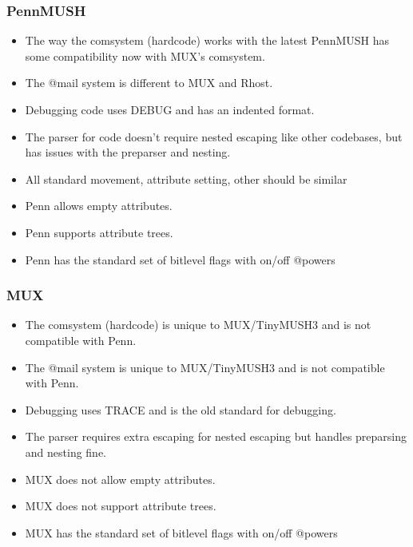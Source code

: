 \documentclass[letterpaper,10pt,english]{sphinxmanual}
\begin{document}
\subsubsection{PennMUSH}
\label{\detokenize{differences:pennmush}}\begin{itemize}
\item {} 
\sphinxAtStartPar
The way the comsystem (hardcode) works with the latest PennMUSH has some
compatibility now with MUX’s comsystem.

\item {} 
\sphinxAtStartPar
The @mail system is different to MUX and Rhost.

\item {} 
\sphinxAtStartPar
Debugging code uses DEBUG and has an indented format.

\item {} 
\sphinxAtStartPar
The parser for code doesn’t require nested escaping like other codebases, but has issues with the pre\sphinxhyphen{}parser and nesting.

\item {} 
\sphinxAtStartPar
All standard movement, attribute setting, other should be similar

\item {} 
\sphinxAtStartPar
Penn allows empty attributes.

\item {} 
\sphinxAtStartPar
Penn supports attribute trees.

\item {} 
\sphinxAtStartPar
Penn has the standard set of bitlevel flags with on/off @powers

\end{itemize}


\subsubsection{MUX}
\label{\detokenize{differences:mux}}\begin{itemize}
\item {} 
\sphinxAtStartPar
The comsystem (hardcode) is unique to MUX/TinyMUSH3 and is not compatible with Penn.

\item {} 
\sphinxAtStartPar
The @mail system is unique to MUX/TinyMUSH3 and is not compatible with Penn.

\item {} 
\sphinxAtStartPar
Debugging uses TRACE and is the old standard for debugging.

\item {} 
\sphinxAtStartPar
The parser requires extra escaping for nested escaping but handles pre\sphinxhyphen{}parsing and nesting fine.

\item {} 
\sphinxAtStartPar
MUX does not allow empty attributes.

\item {} 
\sphinxAtStartPar
MUX does not support attribute trees.

\item {} 
\sphinxAtStartPar
MUX has the standard set of bitlevel flags with on/off @powers

\end{itemize}
\end{document}
